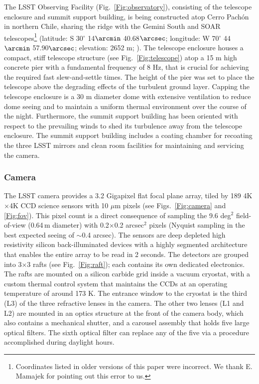 The LSST Observing Facility (Fig.~\ref{Fig:observatory}),
consisting of the telescope enclosure and summit support building, is being constructed atop Cerro Pach\'{o}n in northern Chile,
sharing the ridge with the Gemini South and SOAR telescopes\footnote{Coordinates listed in older versions
of this paper were incorrect. We thank E. Mamajek for pointing out this error to us.}
(latitude: S 30$^\circ$ 14$\arcmin$ 40.68$\arcsec$; longitude: W 70$^\circ$ 44$\arcmin$ 57.90$\arcsec$; elevation: 2652 m;
\citealt{2012arXiv1210.1616M}).  The telescope enclosure houses a compact, stiff
telescope structure (see Fig.~\ref{Fig:telescope}) atop a 15 m high concrete pier
with a fundamental frequency of 8 Hz, that is crucial for achieving the required fast slew-and-settle times.  The height of the pier was set to place the telescope above the degrading
effects of the turbulent ground layer.  Capping the telescope
enclosure is a 30 m diameter dome with extensive ventilation to reduce
dome seeing
and to maintain a uniform thermal environment over the course of the night.  Furthermore, the summit support
building has been oriented with respect to the prevailing winds to shed its turbulence away from the
telescope enclosure.  The summit support building includes a coating chamber for recoating the three LSST mirrors and
clean room facilities for maintaining and servicing the camera.


\subsubsection{ Camera }


The LSST camera provides a 3.2 Gigapixel flat focal plane array, tiled by 189
4K$\times$4K CCD science sensors with 10 $\mu$m pixels (see Figs.~\ref{Fig:camera}
and \ref{Fig:fov}). This pixel count is a direct consequence of sampling the
9.6 deg$^2$ field-of-view (0.64\,m diameter) with 0.2$\times$0.2 arcsec$^2$
pixels (Nyquist sampling in the best expected seeing of $\sim$0.4 arcsec).
The sensors are deep depleted high resistivity silicon back-illuminated devices with
a highly segmented architecture that enables the entire array to be read in 2 seconds.
The detectors are grouped into 3$\times$3 rafts (see Fig.~\ref{Fig:raft}); each
contains its own dedicated electronics. The rafts are mounted on a silicon carbide
grid inside a vacuum cryostat, with a custom thermal control system that maintains
the CCDs at an operating temperature of around 173 K. The entrance window to the
cryostat is the third (L3) of the three refractive lenses in the camera. The other
two lenses (L1 and L2) are mounted in an optics structure at the front of the camera
body, which also contains a mechanical shutter, and a carousel assembly that holds
five large optical filters. The sixth optical filter can
replace any of the five via a procedure accomplished during daylight hours.

